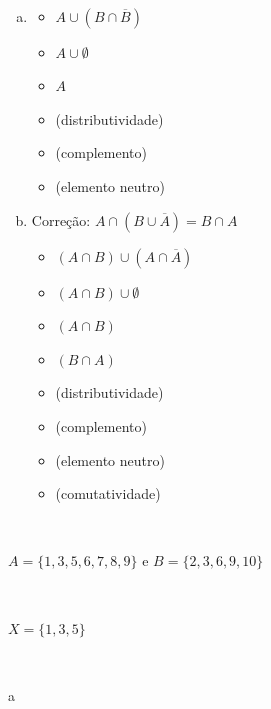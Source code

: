 \begin{Gabarito}{21}
~

    \begin{enumerate}[a)]
    \item
    \begin{multicols}{2}
        \begin{itemize}
            \item $A \cup (B \cap \overline{B})$
            \item $A \cup \emptyset$
            \item $A$
        \end{itemize}

        \begin{itemize}
            \item (distributividade)
            \item (complemento)
            \item (elemento neutro)
        \end{itemize}
    \end{multicols}

    \item

    Correção: $A \cap (B \cup \overline{A}) = B \cap A$

    \begin{multicols}{2}
        \begin{itemize}
            \item $(A \cap B) \cup (A \cap \overline{A})$
            \item $(A \cap B) \cup \emptyset$
            \item $(A \cap B)$
            \item $(B \cap A)$
        \end{itemize}

        \begin{itemize}
            \item (distributividade)
            \item (complemento)
            \item (elemento neutro)
            \item (comutatividade)
        \end{itemize}
    \end{multicols}
\end{enumerate}
\end{Gabarito}
\begin{Gabarito}{22}
~

    $A=\{1,3,5,6,7,8,9\}$ e $B=\{2,3,6,9,10\}$
\end{Gabarito}
\begin{Gabarito}{23}
~

    $X=\{1,3,5\}$
\end{Gabarito}
\begin{Gabarito}{24}
~


    a
\end{Gabarito}
